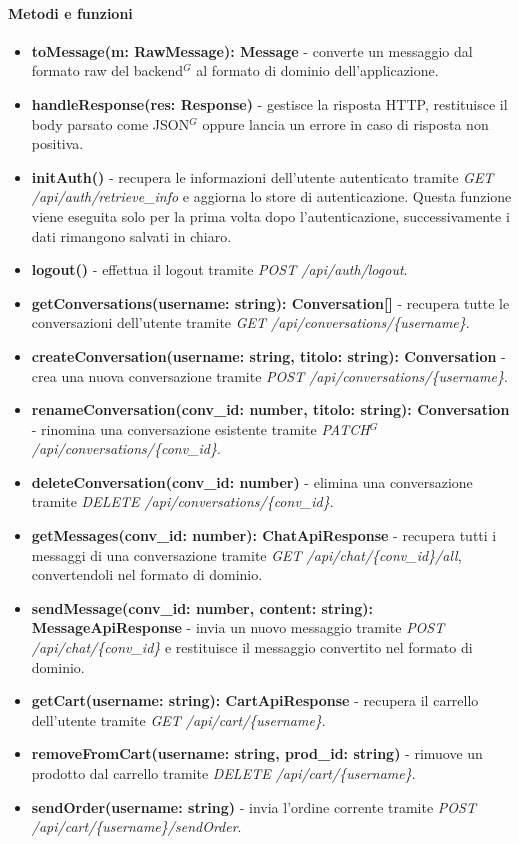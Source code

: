 \paragraph{Metodi e funzioni}
\begin{itemize}
	\item \textbf{toMessage(m: RawMessage): Message} - converte un messaggio dal formato raw del backend$^G$ al formato di dominio dell'applicazione.
	\item \textbf{handleResponse(res: Response)} - gestisce la risposta HTTP, restituisce il body parsato come JSON$^G$ oppure lancia un errore in caso di risposta non positiva.
	\item \textbf{initAuth()} - recupera le informazioni dell'utente autenticato tramite \textit{GET /api/auth/retrieve\_info} e aggiorna lo store di autenticazione. Questa funzione viene eseguita solo per la prima volta dopo l'autenticazione, successivamente i dati rimangono salvati in chiaro.
	\item \textbf{logout()} - effettua il logout tramite \textit{POST /api/auth/logout}.
	\item \textbf{getConversations(username: string): Conversation[]} - recupera tutte le conversazioni dell'utente tramite \textit{GET /api/conversations/\{username\}}.
	\item \textbf{createConversation(username: string, titolo: string): Conversation} - crea una nuova conversazione tramite \textit{POST /api/conversations/\{username\}}.
	\item \textbf{renameConversation(conv\_id: number, titolo: string): Conversation} - rinomina una conversazione esistente tramite \textit{PATCH$^G$ /api/conversations/\{conv\_id\}}.
	\item \textbf{deleteConversation(conv\_id: number)} - elimina una conversazione tramite \textit{DELETE /api/conversations/\{conv\_id\}}.
	\item \textbf{getMessages(conv\_id: number): ChatApiResponse} - recupera tutti i messaggi di una conversazione tramite \textit{GET /api/chat/\{conv\_id\}/all}, convertendoli nel formato di dominio.
	\item \textbf{sendMessage(conv\_id: number, content: string): MessageApiResponse} - invia un nuovo messaggio tramite \textit{POST /api/chat/\{conv\_id\}} e restituisce il messaggio convertito nel formato di dominio.
	\item \textbf{getCart(username: string): CartApiResponse} - recupera il carrello dell'utente tramite \textit{GET /api/cart/\{username\}}.
	\item \textbf{removeFromCart(username: string, prod\_id: string)} - rimuove un prodotto dal carrello tramite \textit{DELETE /api/cart/\{username\}}.
	\item \textbf{sendOrder(username: string)} - invia l'ordine corrente tramite \textit{POST /api/cart/\{username\}/sendOrder}.
\end{itemize}